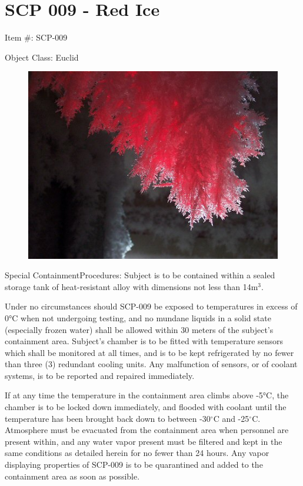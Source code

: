 \documentclass[a4paper, 11pt]{article}
\newcommand{\degree}{$^{\circ}$}
\begin{document}
\section{SCP 009 - Red Ice}
Item \#: SCP-009

Object Class: Euclid

\begin{figure}
\includegraphics[scale=1.3]{img/scp/009.jpg}
\end{figure}
Special Containment\linebreak Procedures: Subject is to be contained within a sealed storage tank of heat-resistant alloy with dimensions not less than 14m$^3$.

Under no circumstances should SCP-009 be exposed to temperatures in excess of 0°C when not undergoing testing, and no mundane liquids in a solid state (especially frozen water) shall be allowed within 30 meters of the subject's containment area. Subject's chamber is to be fitted with temperature sensors which shall be monitored at all times, and is to be kept refrigerated by no fewer than three (3) redundant cooling units. Any malfunction of sensors, or of coolant systems, is to be reported and repaired immediately.

If at any time the temperature in the containment area climbs above -5°C, the chamber is to be locked down immediately, and flooded with coolant until the temperature has been brought back down to between -30\degree C and -25\degree C. Atmosphere must be evacuated from the containment area when personnel are present within, and any water vapor present must be filtered and kept in the same conditions as detailed herein for no fewer than 24 hours. Any vapor displaying properties of SCP-009 is to be quarantined and added to the containment area as soon as possible.
\end{document}
